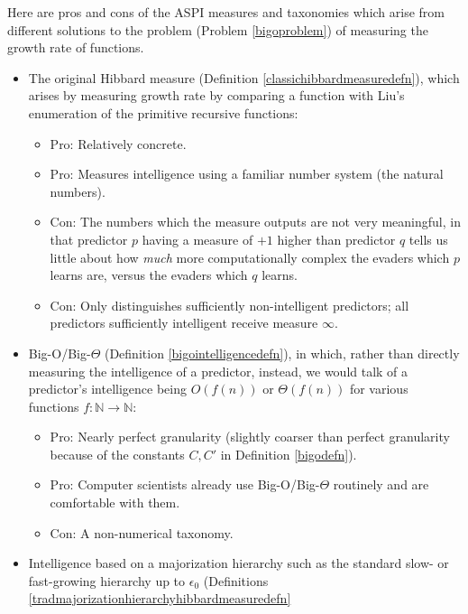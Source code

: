\documentclass[twoside,11pt]{article}
\begin{document}
Here are pros and cons of the ASPI measures and taxonomies which arise
from different solutions
to the problem (Problem \ref{bigoproblem}) of measuring the growth rate of functions.

\begin{itemize}
    \item
    The original Hibbard measure (Definition \ref{classichibbardmeasuredefn}),
    which arises by measuring growth rate by comparing
    a function with Liu's enumeration \citep{liu1960enumeration} of the primitive
    recursive functions:
    \begin{itemize}
        \item
        Pro: Relatively concrete.
        \item
        Pro: Measures intelligence using a familiar number system (the natural numbers).
        \item
        Con: The numbers which the measure outputs are not very meaningful, in
        that predictor $p$ having a measure of
        $+1$ higher than predictor $q$ tells us little
        about how \emph{much} more computationally complex the evaders which $p$
        learns are, versus the evaders which $q$ learns.
        \item
        Con: Only distinguishes sufficiently non-intelligent predictors; all predictors
        sufficiently intelligent receive measure $\infty$.
    \end{itemize}
    \item
    Big-O/Big-$\Theta$ (Definition \ref{bigointelligencedefn}),
    in which, rather than directly measuring the intelligence of a predictor, instead, we
    would talk of a predictor's intelligence being $O(f(n))$ or $\Theta(f(n))$
    for various functions $f:\mathbb N\to\mathbb N$:
    \begin{itemize}
        \item
        Pro: Nearly perfect granularity (slightly coarser than perfect granularity because
        of the constants $C,C'$ in Definition \ref{bigodefn}).
        \item
        Pro: Computer scientists already use Big-O/Big-$\Theta$ routinely
        and are comfortable with them.
        \item
        Con: A non-numerical taxonomy.
    \end{itemize}
    \item
    Intelligence based on a majorization hierarchy such as the
    standard slow- or fast-growing hierarchy up to $\epsilon_0$
    (Definitions \ref{tradmajorizationhierarchyhibbardmeasuredefn}

\end{itemize}
\end{document}
